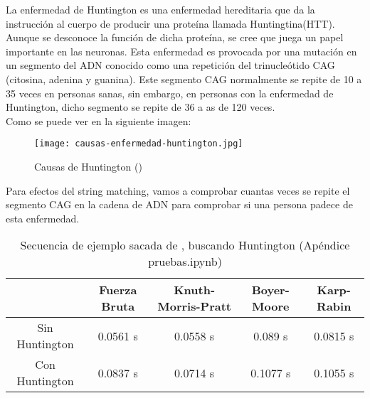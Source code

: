 \quad La enfermedad de Huntington es una enfermedad hereditaria que da la instrucción al cuerpo de producir una proteína llamada Huntingtina(HTT). Aunque se desconoce la función de dicha proteína, se cree que juega un papel importante en las neuronas. Esta enfermedad es provocada por una mutación en un segmento del ADN conocido como una repetición del trinucleótido CAG (citosina, adenina y guanina). Este segmento CAG normalmente se repite de 10 a 35 veces en personas sanas, sin embargo, en personas con la enfermedad de Huntington, dicho segmento se repite de 36 a as de 120 veces. \\

Como se puede ver en la siguiente imagen: 
\begin{figure} [H]
\texttt{[image: causas-enfermedad-huntington.jpg]}
\caption{Causas de Huntington (\cite{ADN2})}
\label{fig:Hunttington}
\end{figure}


\quad Para efectos del string matching, vamos a comprobar cuantas veces se repite  el segmento CAG en la cadena de ADN para comprobar si una persona padece de esta enfermedad.

\begin{table} [h!]
    \begin{tabular}{|c| c | c | c | c |}
        \hline
        & Fuerza Bruta & Knuth-Morris-Pratt & Boyer-Moore & Karp-Rabin \\
        \hline
        Sin Huntington & 0.0561 s & 0.0558 s& 0.089 s & 0.0815 s\\
        \hline
        Con Huntington & 0.0837 s & 0.0714 s & 0.1077 s & 0.1055 s\\
        \hline
    \end{tabular}
    \caption{Secuencia de ejemplo sacada de \cite{ADNCATSEQUENCE}, buscando Huntington (Apéndice pruebas.ipynb)}
    \label{tab:DNAH}
\end{table}

